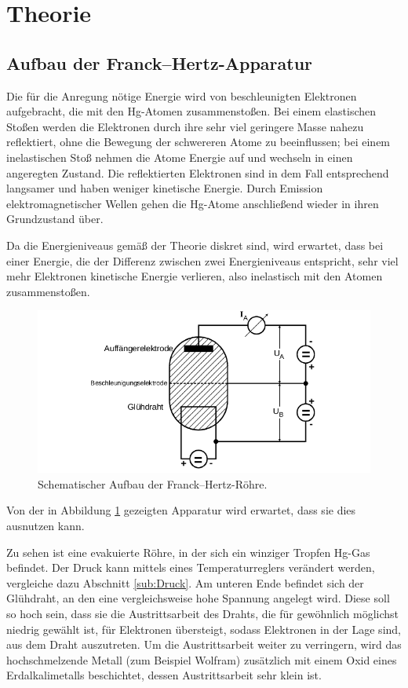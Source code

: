 \section{Theorie}
\label{sec:Theorie}

\subsection{Aufbau der Franck--Hertz-Apparatur}

Die für die Anregung nötige Energie wird von beschleunigten Elektronen aufgebracht, die mit den Hg-Atomen zusammenstoßen. 
Bei einem elastischen Stoßen werden die Elektronen durch ihre sehr viel geringere Masse nahezu reflektiert, ohne die Bewegung der 
schwereren Atome zu beeinflussen; bei einem inelastischen Stoß nehmen die Atome Energie auf und wechseln in einen angeregten Zustand.
Die reflektierten Elektronen sind in dem Fall entsprechend langsamer und haben weniger kinetische Energie. Durch Emission elektromagnetischer Wellen 
gehen die Hg-Atome anschließend wieder in ihren Grundzustand über. \cite{Versuchsanleitung}

Da die Energieniveaus gemäß der Theorie diskret sind, wird erwartet, dass bei einer Energie, die der Differenz zwischen 
zwei Energieniveaus entspricht, sehr viel mehr Elektronen kinetische Energie verlieren, also inelastisch mit den Atomen zusammenstoßen. 

\begin{figure}
    \centering
    \includegraphics[width=\textwidth]{plots/schemaAufbau.png}
    \caption{Schematischer Aufbau der Franck--Hertz-Röhre\cite{Versuchsanleitung}.}
    \label{fig:schemaAufbau}
\end{figure}

Von der in Abbildung \ref{fig:schemaAufbau} gezeigten Apparatur wird erwartet, dass sie dies ausnutzen kann. 

Zu sehen ist eine evakuierte Röhre, in der sich ein winziger Tropfen Hg-Gas befindet. 
Der Druck kann mittels eines Temperaturreglers verändert werden, vergleiche dazu Abschnitt \ref{sub:Druck}. 
Am unteren Ende befindet sich der Glühdraht, an den eine vergleichsweise hohe Spannung angelegt wird. 
Diese soll so hoch sein, dass sie die Austrittsarbeit des Drahts, die für gewöhnlich möglichst niedrig gewählt ist, 
für Elektronen übersteigt, sodass Elektronen in der Lage sind, aus dem Draht auszutreten. 
Um die Austrittsarbeit weiter zu verringern, wird das hochschmelzende Metall (zum Beispiel Wolfram) zusätzlich mit 
einem Oxid eines Erdalkalimetalls beschichtet, dessen Austrittsarbeit sehr klein ist\cite{Versuchsanleitung}. 

